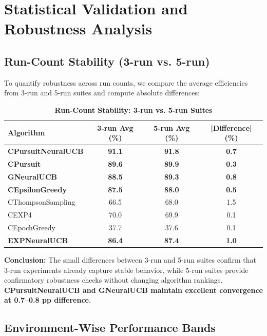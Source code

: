 \documentclass[12pt,a4paper]{article}
\newcommand{\success}[1]{\textcolor{successcolor}{\textbf{#1}}}
\newcommand{\legacy}[1]{\textcolor{legacycolor}{\textbf{#1}}}
\newcommand{\neural}[1]{\textcolor{neuralcolor}{\textbf{#1}}}
\begin{document}
\section{Statistical Validation and Robustness Analysis}

\subsection{Run-Count Stability (3-run vs. 5-run)}

To quantify robustness across run counts, we compare the average efficiencies from 3-run and 5-run suites and compute absolute differences:

\begin{table}[H]
\centering
\caption{\success{Run-Count Stability: 3-run vs. 5-run Suites}}
\begin{tabular}{|l|c|c|c|}
\hline
\textbf{Algorithm} & \textbf{3-run Avg (\%)} & \textbf{5-run Avg (\%)} & \textbf{|Difference| (\%)} \\
\hline
\hline
\neural{CPursuitNeuralUCB}  & \neural{91.1}     & \neural{91.8}     & \neural{0.7} \\
\success{CPursuit}        & \success{89.6} & \success{89.9} & \success{0.3} \\
\neural{GNeuralUCB}         & \neural{88.5} & \neural{89.3} & \neural{0.8} \\
\success{CEpsilonGreedy} & \success{87.5} & \success{88.0} & \success{0.5} \\
CThompsonSampling        & 66.5          & 68.0          & 1.5 \\
CEXP4                    & 70.0          & 69.9          & 0.1 \\
CEpochGreedy             & 37.7          & 37.6          & 0.1 \\
\legacy{EXPNeuralUCB}    & \legacy{86.4} & \legacy{87.4} & \legacy{1.0} \\
\hline
\end{tabular}
\end{table}

\textbf{Conclusion:} The small differences between 3-run and 5-run suites confirm that 3-run experiments already capture stable behavior, while 5-run suites provide confirmatory robustness checks without changing algorithm rankings. \neural{CPursuitNeuralUCB and GNeuralUCB maintain excellent convergence at 0.7--0.8 pp difference}.

\subsection{Environment-Wise Performance Bands}
\end{document}

